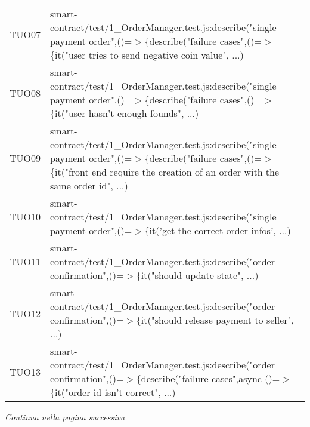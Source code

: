 \begin{table}[H]
\begin{tabular}{c|p{15cm}}
    TUO07 & smart-contract/test/1\_OrderManager.test.js:describe("single payment order",\newline()=$>$\{describe("failure cases",()=$>$\{it("user tries to send negative coin value", ...)                            \\
    TUO08 & smart-contract/test/1\_OrderManager.test.js:describe("single payment order",\newline()=$>$\{describe("failure cases",()=$>$\{it("user hasn't enough founds", ...)                                         \\
    TUO09 & smart-contract/test/1\_OrderManager.test.js:describe("single payment order",\newline()=$>$\{describe("failure cases",()=$>$\{it("front end require the creation of an order with the same order id", ...) \\
    TUO10 & smart-contract/test/1\_OrderManager.test.js:describe("single payment order",\newline()=$>$\{it('get the correct order infos', ...)                                                                        \\
    TUO11 & smart-contract/test/1\_OrderManager.test.js:describe("order confirmation",\newline()=$>$\{it("should update state", ...)                                                                                  \\
    TUO12 & smart-contract/test/1\_OrderManager.test.js:describe("order confirmation",\newline()=$>$\{it("should release payment to seller", ...)                                                                     \\
    TUO13 & smart-contract/test/1\_OrderManager.test.js:describe("order confirmation",\newline()=$>$\{describe("failure cases",async ()=$>$\{it("order id isn't correct", ...)                                        \\
  \end{tabular}
\end{table}
\begin{center}
  \textit{\small Continua nella pagina successiva}
\end{center}
